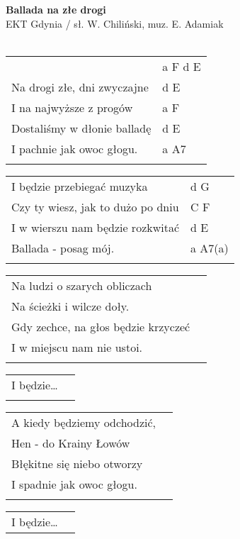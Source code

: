 \documentclass[a5paper]{article}
\begin{document}


\noindent
\fontsize{12pt}{15pt}\selectfont
\textbf{Ballada na złe drogi} \\
\fontsize{8pt}{10pt}\selectfont
EKT Gdynia / sł. W. Chiliński, muz. E. Adamiak \\ \\
\fontsize{10pt}{12pt}\selectfont
{}
\begin{tabular}{@{}p{8.5cm}p{3cm}@{}}
\noindent
& a F d E \\ 
Na drogi złe, dni zwyczajne & d E \\
I na najwyższe z progów & a F \\
Dostaliśmy w dłonie balladę & d E \\
I pachnie jak owoc głogu. & a A7 \\ \\
\end{tabular}

\noindent
\begin{tabular}{@{}p{7.5cm}p{3cm}@{}} 
I będzie przebiegać muzyka & d G \\
Czy ty wiesz, jak to dużo po dniu & C F \\
I w wierszu nam będzie rozkwitać & d E \\
Ballada - posag mój. & a A7(a) \\ \\
\end{tabular}

\noindent
\begin{tabular}{@{}p{8.5cm}p{3cm}@{}}
Na ludzi o szarych obliczach \\
Na ścieżki i wilcze doły. \\
Gdy zechce, na głos będzie krzyczeć \\
I w miejscu nam nie ustoi. \\ \\
\end{tabular}

\noindent
\begin{tabular}{@{}p{8.5cm}p{3cm}@{}}
I będzie… \\ \\
\end{tabular}

\noindent
\begin{tabular}{@{}p{8.5cm}p{3cm}@{}}
A kiedy będziemy odchodzić, \\
Hen - do Krainy Łowów \\
Błękitne się niebo otworzy \\
I spadnie jak owoc głogu. \\ \\
\end{tabular}

\noindent
\begin{tabular}{@{}p{8.5cm}p{3cm}@{}}
I będzie…
\end{tabular}
\end{document}
